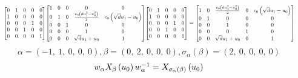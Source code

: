 \documentclass[11pt]{article}
\theoremstyle{definition}
\begin{document}
\[
\scaletoalign{\textwidth}{{\left[\begin{matrix}0 & 1 & 0 & 0 & 0\\1 & 0 & 0 & 0 & 0\\0 & 0 & 0 & 1 & 0\\0 & 0 & 1 & 0 & 0\\0 & 0 & 0 & 0 & 1\end{matrix}\right]} {\left[\begin{matrix}1 & 0 & 0 & 0 & 0\\0 & 1 & 0 & \frac{c_{0} \left(d u_{1}^{2} - u_{0}^{2}\right)}{2} & c_{0} \left(\sqrt{d} u_{1} - u_{0}\right)\\0 & 0 & 1 & 0 & 0\\0 & 0 & 0 & 1 & 0\\0 & 0 & 0 & \sqrt{d} u_{1} + u_{0} & 1\end{matrix}\right]} {\left[\begin{matrix}0 & 1 & 0 & 0 & 0\\1 & 0 & 0 & 0 & 0\\0 & 0 & 0 & 1 & 0\\0 & 0 & 1 & 0 & 0\\0 & 0 & 0 & 0 & 1\end{matrix}\right]} = {\left[\begin{matrix}1 & 0 & \frac{c_{0} \left(d u_{1}^{2} - u_{0}^{2}\right)}{2} & 0 & c_{0} \left(\sqrt{d} u_{1} - u_{0}\right)\\0 & 1 & 0 & 0 & 0\\0 & 0 & 1 & 0 & 0\\0 & 0 & 0 & 1 & 0\\0 & 0 & \sqrt{d} u_{1} + u_{0} & 0 & 1\end{matrix}\right]}}
\]
\[
\alpha = \left( -1, \  1, \  0, \  0, \  0\right), \beta = \left( 0, \  2, \  0, \  0, \  0\right), \sigma_{\alpha}(\beta) = \left( 2, \  0, \  0, \  0, \  0\right)
\]
\[
\scaletoalign{\textwidth}{w_{\alpha} X_{\beta}\left(u_{0}\right) w_{\alpha}^{-1} = X_{\sigma_{\alpha}\left(\beta\right)}\left(u_{0}\right)}
\]
\end{document}
